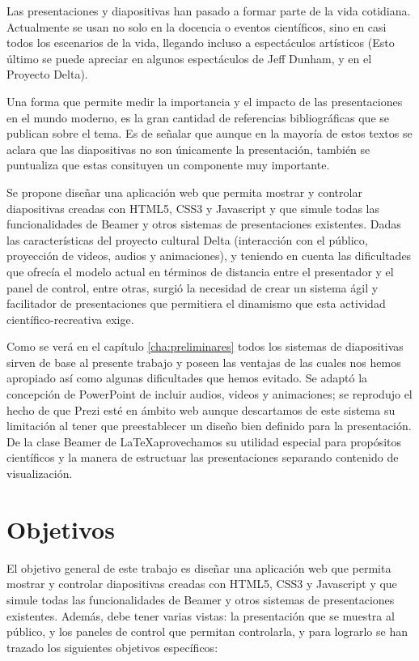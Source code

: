 
\begin{introduction}

	Las presentaciones y diapositivas han pasado a formar parte de la vida cotidiana. Actualmente se usan no solo en la docencia o eventos científicos, sino en casi todos los escenarios de la vida, llegando incluso a espectáculos artísticos (Esto último se puede apreciar en algunos espectáculos de Jeff Dunham, y en el Proyecto Delta).


	Una forma que permite medir la importancia y el impacto de las presentaciones en el mundo moderno, es la gran cantidad de referencias bibliográficas que se publican sobre el tema. Es de señalar que aunque en la mayoría de estos textos se aclara que las diapositivas no son únicamente la presentación, también se puntualiza que estas consituyen un componente muy importante.

	Se propone diseñar una aplicación web que permita mostrar y controlar diapositivas creadas con HTML5, CSS3 y Javascript y que simule todas las funcionalidades de Beamer y otros sistemas de presentaciones existentes. Dadas las características del proyecto cultural Delta (interacción con el público, proyección de videos, audios y animaciones), y teniendo en cuenta las dificultades que ofrecía el modelo actual en términos de distancia entre el presentador y el panel de control, entre otras, surgió la necesidad de crear un sistema ágil y facilitador de presentaciones que permitiera el dinamismo que esta actividad científico-recreativa exige.

	Como se verá en el capítulo \ref{cha:preliminares} todos los sistemas de diapositivas sirven de base al presente trabajo y poseen las ventajas de las cuales nos hemos apropiado así como algunas dificultades que hemos evitado. Se adaptó la concepción de PowerPoint de incluir audios, videos y animaciones; se reprodujo el hecho de que Prezi esté en ámbito web aunque descartamos de este sistema su limitación al tener que preestablecer un diseño bien definido para la presentación. De la clase Beamer de \LaTeX  aprovechamos su utilidad especial para propósitos científicos y la manera de estructuar las presentaciones separando contenido de visualización.


	\section*{Objetivos}

		El objetivo general de este trabajo es diseñar una aplicación web que permita mostrar y controlar diapositivas creadas con HTML5, CSS3 y Javascript y que simule todas las funcionalidades de Beamer y otros sistemas de presentaciones existentes. Además, debe tener varias vistas: la presentación que se muestra al público, y los paneles de control que permitan controlarla, y para lograrlo se han trazado los siguientes objetivos específicos:


\end{introduction}
